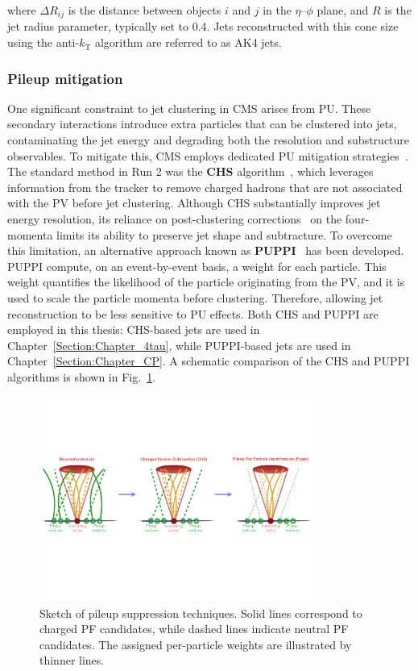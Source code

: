where $\Delta R_{ij}$ is the distance between objects $i$ and $j$ in the $\eta$–$\phi$ plane, and $R$ is the jet radius parameter, typically set to 0.4. Jets reconstructed with this cone size using the anti-$k_\mathrm{T}$ algorithm are referred to as AK4 jets.

\subsubsection{Pileup mitigation}

One significant constraint to jet clustering in CMS arises from PU. These secondary interactions introduce extra particles that can be clustered into jets, contaminating the jet energy and degrading both the resolution and substructure observables. To mitigate this, CMS employs dedicated PU mitigation strategies~\cite{PU_Mitigation}. The standard method in Run 2 was the \textbf{\ac{CHS}} algorithm~\cite{ParticleFlow}, which leverages information from the tracker to remove charged hadrons that are not associated with the PV before jet clustering. Although CHS substantially improves jet energy resolution, its reliance on post-clustering corrections~\cite{JetEnergyCalibration} on the four-momenta limits its ability to preserve jet shape and subtracture. To overcome this limitation, an alternative approach known as \textbf{\ac{PUPPI}}~\cite{PUPPI} has been developed. PUPPI compute, on an event-by-event basis, a weight for each particle. This weight quantifies the likelihood of the particle originating from the PV, and it is used to scale the particle momenta before clustering. Therefore, allowing jet reconstruction to be less sensitive to PU effects. Both CHS and PUPPI are employed in this thesis: CHS-based jets are used in Chapter~\ref{Section:Chapter_4tau}, while PUPPI-based jets are used in Chapter~\ref{Section:Chapter_CP}. A schematic comparison of the CHS and PUPPI algorithms is shown in Fig.~\ref{Figure:Chapter4_Pileup_Schematic}.

\begin{figure}[h]
\centering
\includegraphics[width=0.8\textwidth]{Figures/Chapter4/Pileup_Schematic.png}
\caption[Sketch of pileup suppression techniques]{
Sketch of pileup suppression techniques. Solid lines correspond to charged PF candidates, while dashed lines indicate neutral PF candidates. The assigned per-particle weights are illustrated by thinner lines.}
\label{Figure:Chapter4_Pileup_Schematic}
\end{figure}


